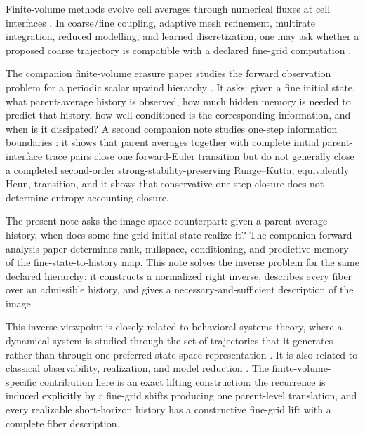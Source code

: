 \documentclass[11pt]{article}
\begin{document}
Finite-volume methods evolve cell averages through numerical fluxes at cell
interfaces \cite{LeVeque2002,EymardGallouetHerbin2000}.  In coarse/fine
coupling, adaptive mesh refinement, multirate integration, reduced modelling,
and learned discretization, one may ask whether a proposed coarse trajectory
is compatible with a declared fine-grid computation
\cite{Berger1987,BergerColella1989,McCorquodaleColella2011,
OsherSanders1983,ConstantinescuSandu2007,BarSinai2019,KochkovEtAl2021}.

The companion finite-volume erasure paper studies the forward observation
problem for a periodic scalar upwind hierarchy
\cite{polemitis2026exactfinitehorizonmemoryconditioning}.  It asks: given a
fine initial state, what parent-average history is observed, how much hidden
memory is needed to predict that history, how well conditioned is the
corresponding information, and when is it dissipated?  A second companion
note studies one-step information boundaries
\cite{PolemitisChristakisDrikakis2026OneStep}: it shows that parent averages
together with complete initial parent-interface trace pairs close one
forward-Euler transition but do not generally close a completed
second-order strong-stability-preserving Runge--Kutta, equivalently Heun,
transition, and it shows that conservative one-step closure does not
determine entropy-accounting closure.

The present note asks the image-space counterpart: given a parent-average
history, when does some fine-grid initial state realize it?  The companion
forward-analysis paper determines rank, nullspace, conditioning, and
predictive memory of the fine-state-to-history map.  This note solves the
inverse problem for the same declared hierarchy: it constructs a normalized
right inverse, describes every fiber over an admissible history, and gives a
necessary-and-sufficient description of the image.

This inverse viewpoint is closely related to behavioral systems theory,
where a dynamical system is studied through the set of trajectories that it
generates rather than through one preferred state-space representation
\cite{Willems1986ExactModelling,PoldermanWillems1998,MarkovskyDorfler2021}.
It is also related to classical observability, realization, and model
reduction \cite{CohnDee1988,HoKalman1966,Moore1981,Forney2011,
Antoulas2005,BennerGugercinWillcox2015,PeherstorferWillcox2016}.  The
finite-volume-specific contribution here is an exact lifting construction:
the recurrence is induced explicitly by \(r\) fine-grid shifts producing one
parent-level translation, and every realizable short-horizon history has a
constructive fine-grid lift with a complete fiber description.
\end{document}
